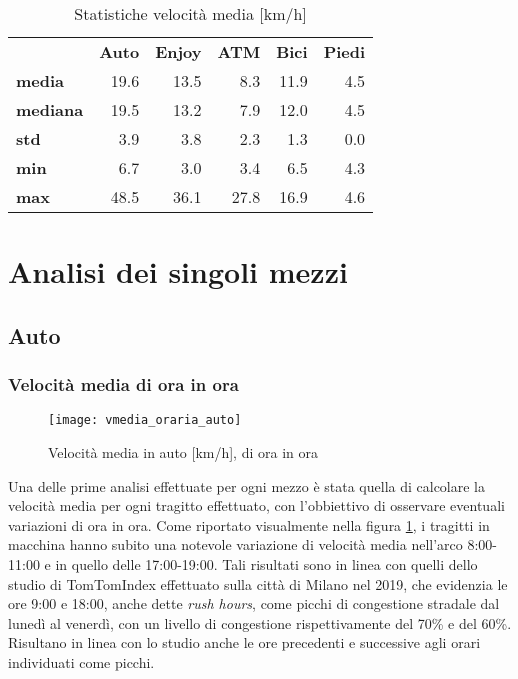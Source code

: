 \begin{table}[H]
	\centering
	\begin{tabular}{ | l r r r r r | }
		\hline
		& \textbf{Auto} & \textbf{Enjoy} & \textbf{ATM} & \textbf{Bici} & \textbf{Piedi} \\
		\textbf{media}   & 19.6 & 13.5 &  8.3 & 11.9 & 4.5 \\
		\textbf{mediana} & 19.5 & 13.2 &  7.9 & 12.0 & 4.5 \\
		\textbf{std}     &  3.9 &  3.8 &  2.3 &  1.3 & 0.0 \\
		\textbf{min}     &  6.7 &  3.0 &  3.4 &  6.5 & 4.3 \\
		\textbf{max}     & 48.5 & 36.1 & 27.8 & 16.9 & 4.6 \\
		\hline
	\end{tabular}
	\caption{Statistiche velocità media [km/h]}
	\label{table:3}
\end{table}

\section{Analisi dei singoli mezzi}

\subsection{Auto}

\subsubsection{Velocità media di ora in ora}
\begin{figure}[!h]
	\texttt{[image: vmedia\_oraria\_auto]}
	\caption{Velocità media in auto [km/h], di ora in ora}
	\label{image:1}
\end{figure}

Una delle prime analisi effettuate per ogni mezzo è stata quella di calcolare la velocità media per ogni tragitto effettuato, con l'obbiettivo di osservare eventuali variazioni di ora in ora. Come riportato visualmente nella figura \ref{image:1}, i tragitti in macchina hanno subito una notevole variazione di velocità media nell'arco 8:00-11:00 e in quello delle 17:00-19:00. Tali risultati sono in linea con quelli dello studio di TomTomIndex\cite{tomtomindexmilan} effettuato sulla città di Milano nel 2019, che evidenzia le ore 9:00 e 18:00, anche dette \textit{rush hours}, come picchi di congestione stradale dal lunedì al venerdì, con un livello di congestione rispettivamente del 70\% e del 60\%. Risultano in linea con lo studio anche le ore precedenti e successive agli orari individuati come picchi.

